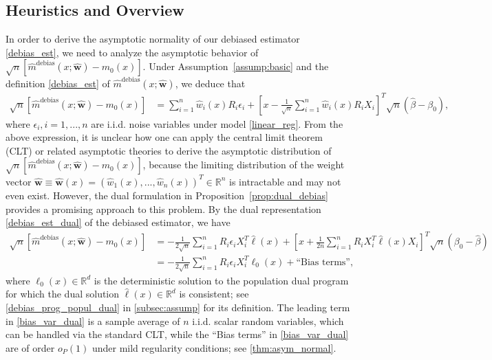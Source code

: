 \documentclass[ejsv2,noshowframe]{imsart}
\theoremstyle{plain}
\theoremstyle{definition}
\theoremstyle{remark}
\renewcommand{\hat}{\widehat}
\begin{document}
\subsection{Heuristics and Overview}
\label{subsec:heuristic}

In order to derive the asymptotic normality of our debiased estimator \eqref{debias_est}, we need to analyze the asymptotic behavior of $\sqrt{n}\left[\hat{m}^{\text{debias}}(x;\hat{\bm{w}}) - m_0(x) \right]$. Under Assumption~\ref{assump:basic} and the definition \eqref{debias_est} of $\hat{m}^{\text{debias}}(x;\hat{\bm{w}})$, we deduce that
\begin{align*}
	\sqrt{n}\left[\hat{m}^{\text{debias}}(x;\hat{\bm{w}}) - m_0(x) \right] &= \sum_{i=1}^n \hat{w}_i(x) R_i \epsilon_i + \left[x-\frac{1}{\sqrt{n}} \sum_{i=1}^n \hat{w}_i(x) R_i X_i\right]^T \sqrt{n}\left(\hat{\beta} - \beta_0\right),
\end{align*}
where $\epsilon_i,i=1,...,n$ are i.i.d. noise variables under model \eqref{linear_reg}. From the above expression, it is unclear how one can apply the central limit theorem (CLT) or related asymptotic theories to derive the asymptotic distribution of $\sqrt{n}\left[\hat{m}^{\text{debias}}(x;\hat{\bm{w}}) - m_0(x) \right]$, because the limiting distribution of the weight vector $\hat{\bm{w}}\equiv \hat{\bm{w}}(x)= \left(\hat{w}_1(x),...,\hat{w}_n(x)\right)^T \in \mathbb{R}^n$ is intractable and may not even exist. However, the dual formulation in Proposition~\ref{prop:dual_debias} provides a promising approach to this problem. By the dual representation \eqref{debias_est_dual} of the debiased estimator, we have
\begin{align}
	\label{bias_var_dual}
	\sqrt{n}\left[\hat{m}^{\text{debias}}(x;\hat{\bm{w}}) - m_0(x)\right] 
	&= -\frac{1}{2\sqrt{n}} \sum_{i=1}^n R_i\epsilon_i X_i^T\hat{\ell}(x) + \left[x + \frac{1}{2n}\sum_{i=1}^n R_i X_i^T\hat{\ell}(x) X_i \right]^T \sqrt{n}\left(\beta_0 -\hat{\beta} \right) \nonumber\\
	&= -\frac{1}{2\sqrt{n}} \sum_{i=1}^n R_i\epsilon_i X_i^T\ell_0(x) + \text{``Bias terms''},
\end{align}
where $\ell_0(x) \in \mathbb{R}^d$ is the deterministic solution to the population dual program for which the dual solution $\hat{\ell}(x) \in \mathbb{R}^d$ is consistent; see \eqref{debias_prog_popul_dual} in \autoref{subsec:assump} for its definition. The leading term in \eqref{bias_var_dual} is a sample average of $n$ i.i.d. scalar random variables, which can be handled via the standard CLT, while the ``Bias terms'' in \eqref{bias_var_dual} are of order $o_P(1)$ under mild regularity conditions; see \autoref{thm:asym_normal}.
\end{document}
